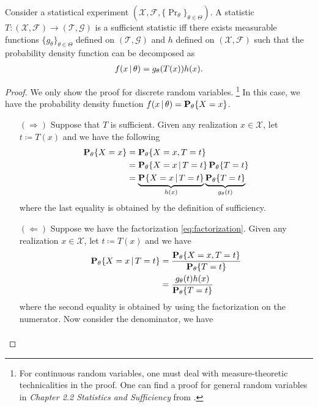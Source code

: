 \documentclass[a4paper]{article}
\begin{document}
\begin{theorem}\label{thm:fisher-neyman-factorization}
	Consider a statistical experiment $(\mathcal{X},\mathcal{F},\{\Pr_{\theta}\}_{\theta\in\Theta})$.
	A statistic $T:(\mathcal{X},\mathcal{F})\to(\mathcal{T},\mathcal{G})$ is a sufficient statistic iff
	there exists measurable functions $\{g_{\theta}\}_{\theta\in\Theta}$ defined on $(\mathcal{T},\mathcal{G})$ and
	$h$ defined on $(\mathcal{X},\mathcal{F})$ such that the probability density function can be decomposed as
	\begin{align}\label{eq:factorization}
		f(x\given\theta) = g_{\theta}(T(x)) h(x).
	\end{align}
\end{theorem}
\begin{proof}
	We only show the proof for discrete random variables.
	\footnote{
		For continuous random variables,
		one must deal with measure-theoretic technicalities in the proof.
		One can find a proof for general random variables in
		\emph{Chapter 2.2 Statistics and Sufficiency} from
		\cite{shao-1999}.
	}
	In this case, we have the probability density function $f(x\given\theta)=\pr[\theta]{X=x}$.
	\begin{itemize}
		\item[$(\Rightarrow)$]
			Suppose that $T$ is sufficient.
			Given any realization $x\in\mathcal{X}$,
			let $t\coloneqq T(x)$ and we have the following
			\begin{align*}
				\pr[\theta]{X=x}
				&= \pr[\theta]{X=x,T=t} \\
				&= \pr[\theta]{X=x\given T=t} \pr[\theta]{T=t} \\
				&= \underbrace{\pr{X=x\given T=t}}_{h(x)} \underbrace{\pr[\theta]{T=t}}_{g_{\theta}(t)}
			\end{align*}
			where the last equality is obtained by the definition of sufficiency.
		\item[$(\Leftarrow)$]
			Suppose we have the factorization \eqref{eq:factorization}.
			Given any realization $x\in\mathcal{X}$,
			let $t\coloneqq T(x)$ and we have
			\begin{align*}
				\pr[\theta]{X=x\given T=t}
				&= \frac{ \pr[\theta]{X=x,T=t} }{ \pr[\theta]{T=t} } \\
				&= \frac{ g_{\theta}(t) h(x) }{ \pr[\theta]{T=t} }
			\end{align*}
			where the second equality is obtained by using the factorization on the numerator.
			Now consider the denominator, we have
			\begin{align*}

\end{align*}
\end{itemize}
\end{proof}
\end{document}
